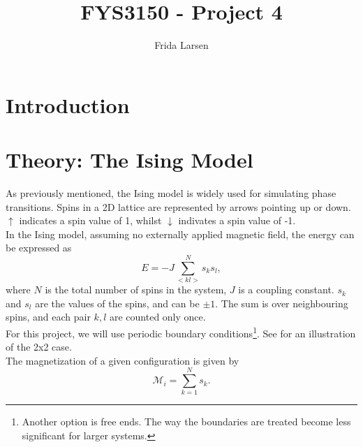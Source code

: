 \documentclass[notitlepage, reprint, nofootinbib]{revtex4-1}
\begin{document}
\title{FYS3150 - Project 4}
\author{Frida Larsen}

\begin{abstract}
{\color{red}{The best abstract there ever was.}}
\end{abstract}

\maketitle

\section{Introduction}

\section{Theory: The Ising Model}
As previously mentioned, the Ising model is widely used for simulating phase transitions. Spins in a 2D lattice are represented by arrows pointing up or down. $\uparrow$ indicates a spin value of 1, whilst $\downarrow$ indivates a spin value of -1. \\[2mm]
In the Ising model, assuming no externally applied magnetic field, the energy can be expressed as 
\begin{equation}\label{Ising_energy}E=-J\sum_{<kl>}^Ns_ks_l,\end{equation}
where $N$ is the total number of spins in the system, $J$ is a coupling constant. $s_k$ and $s_l$ are the values of the spins, and can be $\pm1$. The sum is over neighbouring spins, and each pair $k,l$ are counted only once. \\[2mm]
For this project, we will use periodic boundary conditions\footnote{Another option is free ends. The way the boundaries are treated become less significant for larger systems.}. See {\color{red}{figure - see doodle above 'becomes a torus' in notebook!}} for an illustration of the 2x2 case.\\[2mm]
The magnetization of a given configuration is given by
\begin{equation}\label{magnetization}\mathcal{M}_i=\sum_{k=1}^N s_k.\end{equation}
\end{document}
